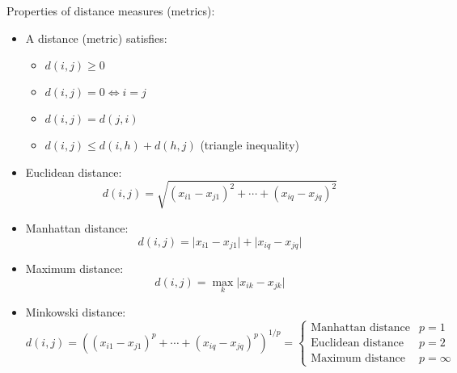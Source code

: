 \documentclass[a4paper]{article}
\begin{document}
Properties of distance measures (metrics):
\begin{itemize}
    \item A distance (metric) satisfies:
    \begin{itemize}
        \item $d(i,j)\geq 0$
        \item $d(i,j)=0\Longleftrightarrow i=j$ 
        \item $d(i,j)=d(j,i)$
        \item $d(i,j)\leq d(i,h)+d(h,j)$ (triangle inequality)
    \end{itemize}
    \item Euclidean distance:
    \[d(i,j)=\sqrt{(x_{i1}-x_{j1})^2+\cdots+(x_{iq}-x_{jq})^2 } \]
    \item Manhattan distance:
    \[d(i,j)=\lvert x_{i1}-x_{j1}\rvert + \lvert x_{iq}-x_{jq}\rvert \]
    \item Maximum distance:
    \[d(i,j)=\max_{k}\lvert x_{ik}-x_{jk}\rvert \]
    \item Minkowski distance:
    \begin{equation*}
        d(i,j)=\left((x_{i1}-x_{j1})^p+\cdots+(x_{iq}-x_{jq})^p \right)^{1/p}=
        \begin{cases}
            \text{Manhattan distance} & p=1 \\
            \text{Euclidean distance} & p=2 \\
            \text{Maximum distance} & p=\infty
        \end{cases}
    \end{equation*}
\end{itemize}
\end{document}
